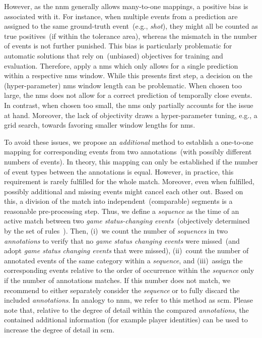 However, as the \acrshort{nnm} generally allows many-to-one mappings, a positive bias is associated with it. For instance, when multiple events from a prediction are assigned to the same ground-truth event~(e.g., \textit{shot}), they might all be counted as true positives~(if within the tolerance area), whereas the mismatch in the number of events is not further punished. This bias is particularly problematic for automatic solutions that rely on~(unbiased) objectives for training and evaluation. 
Therefore, \citet{sanford2020group} apply a \acrfull{nms} which only allows for a single prediction within a respective \acrshort{nms} window. While this presents first step, a decision on the (hyper-parameter) \acrshort{nms} window length can be problematic. When chosen too large, the \acrshort{nms} does not allow for a correct prediction of temporally close events. In contrast, when chosen too small, the \acrshort{nms} only partially accounts for the issue at hand. Moreover, the lack of objectivity draws a hyper-parameter tuning, e.g., a grid search, towards favoring smaller window lengths for \acrshort{nms}. 

To avoid these issues, we propose an \emph{additional} method to establish a one-to-one mapping for corresponding events from two annotations~(with possibly different numbers of events). 
In theory, this mapping can only be established if the number of event types between the annotations is equal. However, in practice, this requirement is rarely fulfilled for the whole match. Moreover, even when fulfilled, possibly additional and missing events might cancel each other out. 
Based on this, a division of the match into independent~(comparable) segments is a reasonable pre-processing step. Thus, we define a \textit{sequence} as the time of an active match between two \textit{game status-changing events}~(objectively determined by the set of rules~\cite{IFAB, IHF}). Then, (i)~we count the number of \textit{sequences} in two \textit{annotations} to verify that no \textit{game status changing events} were missed~(and adopt \textit{game status changing events} that were missed), (ii)~count the number of annotated events of the same category within a \textit{sequence}, and (iii)~assign the corresponding events relative to the order of occurrence within the \textit{sequence} only if the number of annotations matches.
If this number does not match, we recommend to either separately consider the \textit{sequence} or to fully discard the included \textit{annotations}.
In analogy to \acrshort{nnm}, we refer to this method as \acrfull{scm}.
Please note that, relative to the degree of detail within the compared \textit{annotations}, the contained additional information (for example player identities) can be used to increase the degree of detail in \acrshort{scm}.

